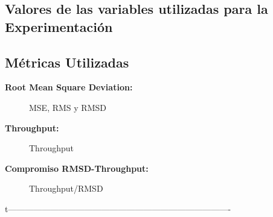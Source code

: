 \subsection{Valores de las variables utilizadas para la Experimentaci\'on}


\subsection{M\'etricas Utilizadas}
\begin{description}
    \item[\textbf{Root Mean Square Deviation:}] MSE, RMS y RMSD

    \item[\textbf{Throughput:}] Throughput

    \item[\textbf{Compromiso RMSD-Throughput:}] Throughput/RMSD

\end{description}

t-------------------------------------------------------------------------------
